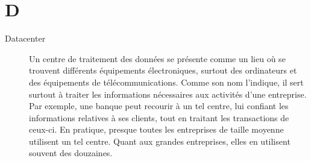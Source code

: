 \section{D}

\begin{description}
    \item[Datacenter]
    Un centre de traitement des données se présente comme un lieu où se trouvent différents équipements électroniques, surtout des ordinateurs et des équipements de télécommunications. Comme son nom l'indique, il sert surtout à traiter les informations nécessaires aux activités d'une entreprise. Par exemple, une banque peut recourir à un tel centre, lui confiant les informations relatives à ses clients, tout en traitant les transactions de ceux-ci. En pratique, presque toutes les entreprises de taille moyenne utilisent un tel centre. Quant aux grandes entreprises, elles en utilisent souvent des douzaines.

\end{description}
